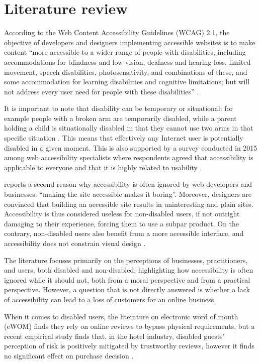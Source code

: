 \section{Literature review}

According to the Web Content Accessibility Guidelines (WCAG) 2.1, the objective of
developers and designers implementing accessible websites is to make content ``more
accessible to a wider range of people with disabilities, including accommodations for
blindness and low vision, deafness and hearing loss, limited movement, speech
disabilities, photosensitivity, and combinations of these, and some accommodation for
learning disabilities and cognitive limitations; but will not address every user need
for people with these disabilities'' \cite{wcag21}.

It is important to note that disability can be temporary or situational: for example
people with a broken arm are temporarily disabled, while a parent holding a child is
situationally disabled in that they cannot use two arms in that specific situation
\cite{henry2006}. This means that effectively any Internet user is potentially disabled
in a given moment. This is also supported by a survey conducted in 2015 among web
accessibility specialists where respondents agreed that accessibility is applicable to
everyone and that it is highly related to usability \cite{yesilada2015}.

 reports a second reason why accessibility is often
ignored by web developers and businesses: ``making the site accessible makes it
boring''. Moreover, designers are convinced that building an accessible site results in
uninteresting and plain sites. Accessibility is thus considered useless for
non-disabled users, if not outright damaging to their experience, forcing them to use a
subpar product. On the contrary, non-disabled users also benefit from a more accessible
interface, and accessibility does not constrain visual design
\cite{schmutz2016implementing, petrie2004}.

The literature focuses primarily on the perceptions of businesses, practitioners, and
users, both disabled and non-disabled, highlighting how accessibility is often ignored
while it should not, both from a moral perspective and from a practical perspective.
However, a question that is not directly answered is whether a lack of accessibility
can lead to a loss of customers for an online business.

When it comes to disabled users, the literature on electronic word of mouth (eWOM)
finds they rely on online reviews to bypass physical requirements, but a recent
empirical study finds that, in the hotel industry, disabled guests' perception of risk
is positively mitigated by trustworthy reviews, however it finds no significant effect
on purchase decision \cite{williams2006, zhang2021}.

